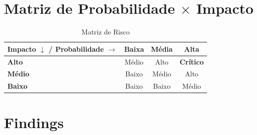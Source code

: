 \documentclass[12pt, a4paper]{report}
\newcommand{\thead}[1]{\bfseries\small\color{white}#1}
\begin{document}
\section{Matriz de Probabilidade $\times$ Impacto}

\begin{table}[H]
\centering
\caption{Matriz de Risco}
\begin{tabular}{l c c c}
\toprule
\rowcolor{TableHead}
\thead{Impacto $\downarrow$ / Probabilidade $\rightarrow$}
  & \thead{Baixa} & \thead{Média} & \thead{Alta} \\
\midrule
\textbf{Alto}
  & \cellcolor{Medium!60}Médio
  & \cellcolor{High!70}\color{white}Alto
  & \cellcolor{Critical}\color{white}\bfseries Crítico \\
\midrule
\textbf{Médio}
  & \cellcolor{Low!60}\color{white}Baixo
  & \cellcolor{Medium!60}Médio
  & \cellcolor{High!70}\color{white}Alto \\
\midrule
\textbf{Baixo}
  & \cellcolor{Low!60}\color{white}Baixo
  & \cellcolor{Low!60}\color{white}Baixo
  & \cellcolor{Medium!60}Médio \\
\bottomrule
\end{tabular}
\end{table}

\section{Findings}
\end{document}
